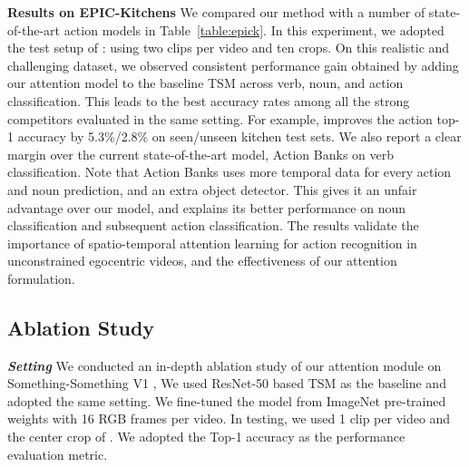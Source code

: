 \documentclass[runningheads]{llncs}
\newcommand{\keypoint}[1]{\vspace{0.1cm}\noindent\textbf{#1}\quad}
\begin{document}
\keypoint{Results on EPIC-Kitchens} 
We compared our method with a number of 
state-of-the-art action models
in Table~\ref{table:epick}.
In this experiment, we adopted the test setup of \cite{price2019evaluation}:
using two clips per video and ten crops.
On this realistic and challenging dataset, we observed consistent performance gain
obtained by adding our \shortname{} attention model to the baseline TSM
across verb, noun, and action classification.
This leads to the best accuracy rates among all the 
strong competitors evaluated in the same setting.
For example, \shortname{} improves the action top-1 accuracy by 5.3\%/2.8\% on seen/unseen kitchen test sets.
We also report a clear margin over the current state-of-the-art model,
Action Banks \cite{wu2019long} on verb classification. 
Note that Action Banks uses more temporal data for every action and noun prediction, and an extra object detector. 
This gives it an unfair advantage over our model, and  explains its better performance on noun classification and subsequent action classification.  
The results validate the importance of spatio-temporal attention learning for action recognition in unconstrained egocentric videos,
and the effectiveness of our \shortname{} attention formulation.






\subsection{Ablation Study}

\keypoint{\em Setting}
We conducted an in-depth ablation study of our \shortname{} attention module
on Something-Something V1 \cite{goyal2017something}, 
We used ResNet-50 based TSM \cite{lin2019tsm} as the baseline and adopted the same setting.
We fine-tuned the model from ImageNet pre-trained weights with 16 RGB frames per video.
In testing, we used 1 clip per video
and the center crop of .
We adopted the Top-1 accuracy as the performance evaluation metric.
\end{document}
